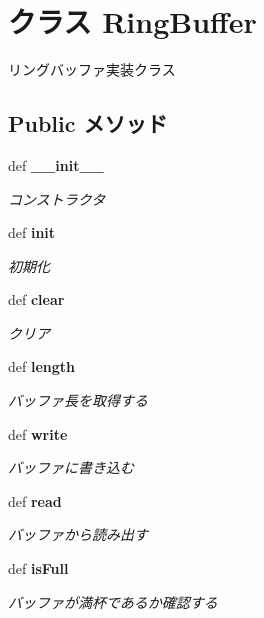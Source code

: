 \section{クラス RingBuffer}
\label{classsource__py_1_1_ring_buffer_1_1_ring_buffer}
リングバッファ実装クラス  


\subsection*{Public メソッド}
\begin{CompactItemize}
\item 
def {\bf \_\-\_\-init\_\-\_\-}
\begin{CompactList}\small\item\em コンストラクタ \item\end{CompactList}\item 
def {\bf init}
\begin{CompactList}\small\item\em 初期化 \item\end{CompactList}\item 
def {\bf clear}
\begin{CompactList}\small\item\em クリア \item\end{CompactList}\item 
def {\bf length}
\begin{CompactList}\small\item\em バッファ長を取得する \item\end{CompactList}\item 
def {\bf write}
\begin{CompactList}\small\item\em バッファに書き込む \item\end{CompactList}\item 
def {\bf read}
\begin{CompactList}\small\item\em バッファから読み出す \item\end{CompactList}\item 
def {\bf isFull}
\begin{CompactList}\small\item\em バッファが満杯であるか確認する \item\end{CompactList}\item 

\end{CompactItemize}

